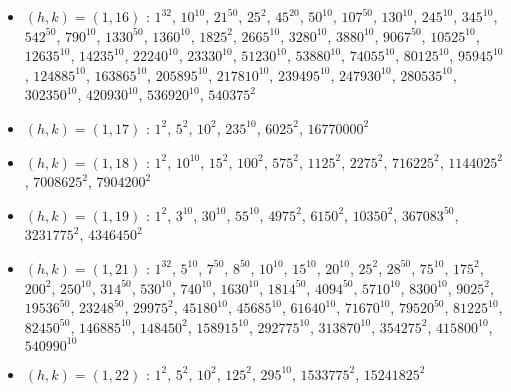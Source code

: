 \begin{itemize}
\item $(h,k)=(1,16)$ : $1^{32}$, $10^{10}$, $21^{50}$, $25^{2}$, $45^{20}$, $50^{10}$, $107^{50}$, $130^{10}$, $245^{10}$, $345^{10}$, $542^{50}$, $790^{10}$, $1330^{50}$, $1360^{10}$, $1825^{2}$, $2665^{10}$, $3280^{10}$, $3880^{10}$, $9067^{50}$, $10525^{10}$, $12635^{10}$, $14235^{10}$, $22240^{10}$, $23330^{10}$, $51230^{10}$, $53880^{10}$, $74055^{10}$, $80125^{10}$, $95945^{10}$, $124885^{10}$, $163865^{10}$, $205895^{10}$, $217810^{10}$, $239495^{10}$, $247930^{10}$, $280535^{10}$, $302350^{10}$, $420930^{10}$, $536920^{10}$, $540375^{2}$
\item $(h,k)=(1,17)$ : $1^{2}$, $5^{2}$, $10^{2}$, $235^{10}$, $6025^{2}$, $16770000^{2}$
\item $(h,k)=(1,18)$ : $1^{2}$, $10^{10}$, $15^{2}$, $100^{2}$, $575^{2}$, $1125^{2}$, $2275^{2}$, $716225^{2}$, $1144025^{2}$, $7008625^{2}$, $7904200^{2}$
\item $(h,k)=(1,19)$ : $1^{2}$, $3^{10}$, $30^{10}$, $55^{10}$, $4975^{2}$, $6150^{2}$, $10350^{2}$, $367083^{50}$, $3231775^{2}$, $4346450^{2}$
\item $(h,k)=(1,21)$ : $1^{32}$, $5^{10}$, $7^{50}$, $8^{50}$, $10^{10}$, $15^{10}$, $20^{10}$, $25^{2}$, $28^{50}$, $75^{10}$, $175^{2}$, $200^{2}$, $250^{10}$, $314^{50}$, $530^{10}$, $740^{10}$, $1630^{10}$, $1814^{50}$, $4094^{50}$, $5710^{10}$, $8300^{10}$, $9025^{2}$, $19536^{50}$, $23248^{50}$, $29975^{2}$, $45180^{10}$, $45685^{10}$, $61640^{10}$, $71670^{10}$, $79520^{50}$, $81225^{10}$, $82450^{50}$, $146885^{10}$, $148450^{2}$, $158915^{10}$, $292775^{10}$, $313870^{10}$, $354275^{2}$, $415800^{10}$, $540990^{10}$
\item $(h,k)=(1,22)$ : $1^{2}$, $5^{2}$, $10^{2}$, $125^{2}$, $295^{10}$, $1533775^{2}$, $15241825^{2}$

\end{itemize}
